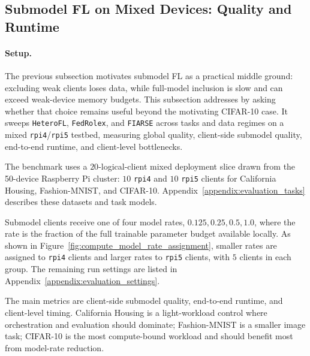 \FloatBarrier
\subsection{Submodel FL on Mixed Devices: Quality and Runtime}

\paragraph{Setup.}
The previous subsection motivates submodel FL as a practical middle ground: excluding weak clients loses data, while full-model inclusion is slow and can exceed weak-device memory budgets. This subsection addresses  by asking whether that choice remains useful beyond the motivating CIFAR-10 case. It sweeps \texttt{HeteroFL}, \texttt{FedRolex}, and \texttt{FIARSE} across tasks and data regimes on a mixed \texttt{rpi4}/\texttt{rpi5} testbed, measuring global quality, client-side submodel quality, end-to-end runtime, and client-level bottlenecks.

The benchmark uses a \(20\)-logical-client mixed deployment slice drawn from the 50-device Raspberry Pi cluster: \(10\) \texttt{rpi4} and \(10\) \texttt{rpi5} clients for California Housing, Fashion-MNIST, and CIFAR-10. Appendix~\ref{appendix:evaluation_tasks} describes these datasets and task models.

Submodel clients receive one of four model rates, \(0.125,0.25,0.5,1.0\), where the rate is the fraction of the full trainable parameter budget available locally. As shown in Figure~\ref{fig:compute_model_rate_assignment}, smaller rates are assigned to \texttt{rpi4} clients and larger rates to \texttt{rpi5} clients, with \(5\) clients in each group. The remaining run settings are listed in Appendix~\ref{appendix:evaluation_settings}.

The main metrics are client-side submodel quality, end-to-end runtime, and client-level timing. California Housing is a light-workload control where orchestration and evaluation should dominate; Fashion-MNIST is a smaller image task; CIFAR-10 is the most compute-bound workload and should benefit most from model-rate reduction.


